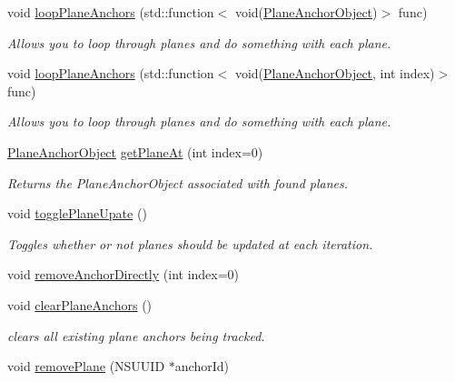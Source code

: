 \begin{DoxyCompactItemize}
\item 
void \hyperlink{class_a_r_core_1_1_a_r_anchor_manager_a170e30f7226b84eaede22392f08d5521}{loop\+Plane\+Anchors} (std\+::function$<$ void(\hyperlink{struct_a_r_objects_1_1_plane_anchor_object}{Plane\+Anchor\+Object})$>$ func)
\begin{DoxyCompactList}\small\item\em Allows you to loop through planes and do something with each plane. \end{DoxyCompactList}\item 
void \hyperlink{class_a_r_core_1_1_a_r_anchor_manager_a6f3215e085a92b1165b3da58138adbfc}{loop\+Plane\+Anchors} (std\+::function$<$ void(\hyperlink{struct_a_r_objects_1_1_plane_anchor_object}{Plane\+Anchor\+Object}, int index)$>$ func)
\begin{DoxyCompactList}\small\item\em Allows you to loop through planes and do something with each plane. \end{DoxyCompactList}\item 
\hyperlink{struct_a_r_objects_1_1_plane_anchor_object}{Plane\+Anchor\+Object} \hyperlink{class_a_r_core_1_1_a_r_anchor_manager_ac885fded5a2a2f5c0b58506786e069f1}{get\+Plane\+At} (int index=0)
\begin{DoxyCompactList}\small\item\em Returns the Plane\+Anchor\+Object associated with found planes. \end{DoxyCompactList}\item 
void \hyperlink{class_a_r_core_1_1_a_r_anchor_manager_a78da6cdbe64e12e49dc67adef5ac085b}{toggle\+Plane\+Upate} ()
\begin{DoxyCompactList}\small\item\em Toggles whether or not planes should be updated at each iteration. \end{DoxyCompactList}\item 
void \hyperlink{class_a_r_core_1_1_a_r_anchor_manager_aeaa578780e37129fb899b3f5a762af63}{remove\+Anchor\+Directly} (int index=0)
\item 
void \hyperlink{class_a_r_core_1_1_a_r_anchor_manager_aec308e2f34682a568b2bda022a21a3ed}{clear\+Plane\+Anchors} ()
\begin{DoxyCompactList}\small\item\em clears all existing plane anchors being tracked. \end{DoxyCompactList}\item 
void \hyperlink{class_a_r_core_1_1_a_r_anchor_manager_a65690e39286b733631eb52c8e740bc79}{remove\+Plane} (N\+S\+U\+U\+ID $\ast$anchor\+Id)

\end{DoxyCompactItemize}
